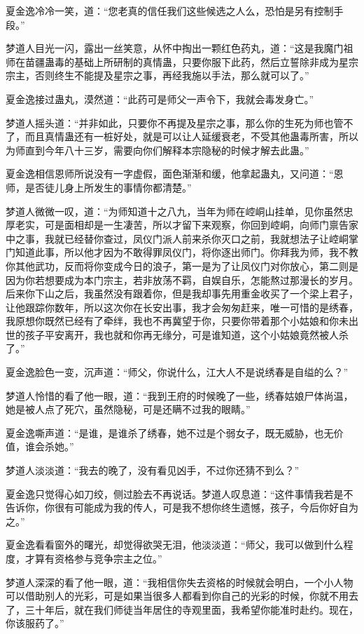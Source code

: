夏金逸冷冷一笑，道：“您老真的信任我们这些候选之人么，恐怕是另有控制手段。”

梦道人目光一闪，露出一丝笑意，从怀中掏出一颗红色药丸，道：“这是我魔门祖师在苗疆蛊毒的基础上所研制的真情蛊，只要你服下此药，然后立誓除非成为星宗宗主，否则终生不能提及星宗之事，再经我施以手法，那么就可以了。”

夏金逸接过蛊丸，漠然道：“此药可是师父一声令下，我就会毒发身亡。”

梦道人摇头道：“并非如此，只要你不再提及星宗之事，那么你的生死为师也管不了，而且真情蛊还有一桩好处，就是可以让人延缓衰老，不受其他蛊毒所害，所以为师直到今年八十三岁，需要向你们解释本宗隐秘的时候才解去此蛊。”

夏金逸相信恩师所说没有一字虚假，面色渐渐和缓，他拿起蛊丸，又问道：“恩师，是否徒儿身上所发生的事情你都清楚。”

梦道人微微一叹，道：“为师知道十之八九，当年为师在崆峒山挂单，见你虽然忠厚老实，可是面相却是一生凄苦，所以才留下来观察，你回到崆峒，向师门禀告家中之事，我就已经替你查过，凤仪门派人前来杀你灭口之前，我就想法子让崆峒掌门知道此事，所以他才因为不敢得罪凤仪门，将你逐出师门。你拜我为师，我不教你其他武功，反而将你变成今日的浪子，第一是为了让凤仪门对你放心，第二则是因为你若想要成为本门宗主，若非放荡不羁，自娱自乐，怎能熬过那漫长的岁月。后来你下山之后，我虽然没有跟着你，但是我却事先用重金收买了一个梁上君子，让他跟踪你数年，所以这次你在长安出事，我才会匆匆赶来，唯一可惜的是绣春，我原想你既然已经有了牵绊，我也不再冀望于你，只要你带着那个小姑娘和你未出世的孩子平安离开，我也就和你再无缘分，可是谁知道，这个小姑娘竟然被人杀了。”

夏金逸脸色一变，沉声道：“师父，你说什么，江大人不是说绣春是自缢的么？”

梦道人怜惜的看了他一眼，道：“我到王府的时候晚了一些，绣春姑娘尸体尚温，她是被人点了死穴，虽然隐秘，可是还瞒不过我的眼睛。”

夏金逸嘶声道：“是谁，是谁杀了绣春，她不过是个弱女子，既无威胁，也无价值，谁会杀她。”

梦道人淡淡道：“我去的晚了，没有看见凶手，不过你还猜不到么？”

夏金逸只觉得心如刀绞，侧过脸去不再说话。梦道人叹息道：“这件事情我若是不告诉你，你很有可能成为我的传人，可是我不想你终生遗憾，孩子，今后你好自为之。”

夏金逸看看窗外的曙光，却觉得欲哭无泪，他淡淡道：“师父，我可以做到什么程度，才算有资格参与竞争宗主之位。”

梦道人深深的看了他一眼，道：“我相信你失去资格的时候就会明白，一个小人物可以借助别人的光彩，可是如果当很多人都看到你自己的光彩的时候，你就不用去了，三十年后，就在我们师徒当年居住的寺观里面，我希望你能准时赴约。现在，你该服药了。”


